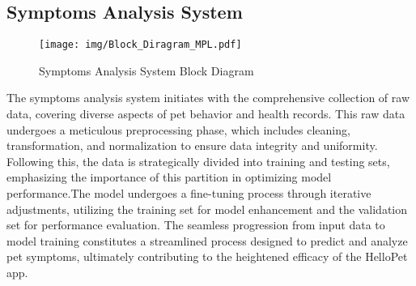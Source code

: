 \subsection{Symptoms Analysis System}
\vspace{1.5cm}
\begin{figure}[H]
\centering
\texttt{[image: img/Block\_Diragram\_MPL.pdf]}
\caption[Symptoms Analysis System Block Diagram]{Symptoms Analysis System Block Diagram}
\label{fig:System block diagram}
\end{figure}
The symptoms analysis system initiates with the comprehensive collection of raw data, covering diverse aspects of pet behavior and health records. This raw data undergoes a meticulous preprocessing phase, which includes cleaning, transformation, and normalization to ensure data integrity and uniformity. Following this, the data is strategically divided into training and testing sets, emphasizing the importance of this partition in optimizing model performance.The model undergoes a fine-tuning process through iterative adjustments, utilizing the training set for model enhancement and the validation set for performance evaluation. The seamless progression from input data to model training constitutes a streamlined process designed to predict and analyze pet symptoms, ultimately contributing to the heightened efficacy of the HelloPet app. 
